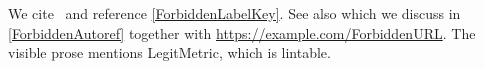 We cite~\cite{ForbiddenCiteKey2020} and reference \ref{ForbiddenLabelKey}.
See also \label{sec:ForbiddenInLabel} which we discuss in
\autoref{ForbiddenAutoref} together with \url{https://example.com/ForbiddenURL}.
The visible prose mentions LegitMetric, which is lintable.
